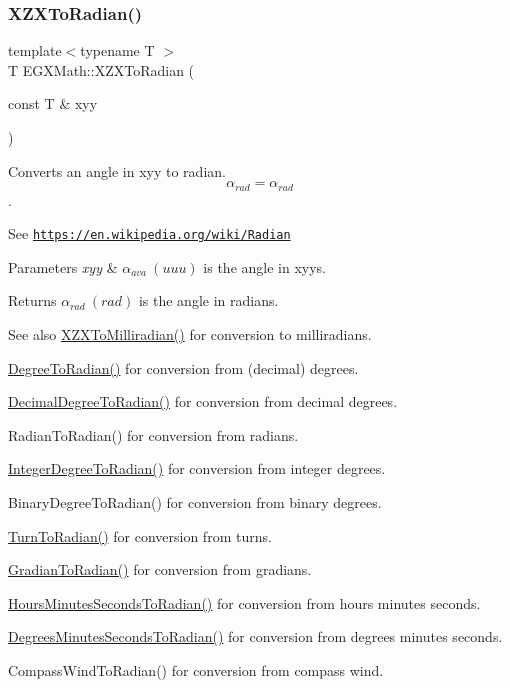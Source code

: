 \subsubsection{\texorpdfstring{X\+Z\+X\+To\+Radian()}{XZXToRadian()}}
{\footnotesize\ttfamily template$<$typename T $>$ \\
T E\+G\+X\+Math\+::\+X\+Z\+X\+To\+Radian (\begin{DoxyParamCaption}\item[{const T \&}]{xyy }\end{DoxyParamCaption})}



Converts an angle in xyy to radian. \[\alpha_{rad}=\alpha_{rad}\]. 

See \href{https://en.wikipedia.org/wiki/Radian}{\tt https\+://en.\+wikipedia.\+org/wiki/\+Radian} 
\begin{DoxyParams}{Parameters}
{\em xyy} & $\alpha_{ava}\ (uuu)$ is the angle in xyys. \\
\hline
\end{DoxyParams}
\begin{DoxyReturn}{Returns}
$\alpha_{rad}\ (rad)$ is the angle in radians. 
\end{DoxyReturn}
\begin{DoxySeeAlso}{See also}
\mbox{\hyperlink{group___e_g_x_math-_angle_conversions-_x_z_x_gadbd00eddee5bd9ee313fabb1a9d3ff3c}{X\+Z\+X\+To\+Milliradian()}} for conversion to milliradians. 

\mbox{\hyperlink{group___e_g_x_math-_angle_conversions-_degree_ga48585541b228c852c9d08a9eac3682f0}{Degree\+To\+Radian()}} for conversion from (decimal) degrees. 

\mbox{\hyperlink{group___e_g_x_math-_angle_conversions-_decimal_degree_ga906ee2c83cdf4caa59eb613dc2d5d52a}{Decimal\+Degree\+To\+Radian()}} for conversion from decimal degrees. 

Radian\+To\+Radian() for conversion from radians. 

\mbox{\hyperlink{group___e_g_x_math-_angle_conversions-_integer_degree_ga05d3368b00ea27b9895de2ffe5c8df38}{Integer\+Degree\+To\+Radian()}} for conversion from integer degrees. 

Binary\+Degree\+To\+Radian() for conversion from binary degrees. 

\mbox{\hyperlink{group___e_g_x_math-_angle_conversions-_turn_ga72e6d3c46ebfc25f7be5050136d8df16}{Turn\+To\+Radian()}} for conversion from turns. 

\mbox{\hyperlink{group___e_g_x_math-_angle_conversions-_gradian_ga7ea0a6f47a672715b960181606c8fd7b}{Gradian\+To\+Radian()}} for conversion from gradians. 

\mbox{\hyperlink{group___e_g_x_math-_angle_conversions-_hours_minutes_seconds_gaa0b04e9012ec739df1464298971e3be7}{Hours\+Minutes\+Seconds\+To\+Radian()}} for conversion from hours minutes seconds. 

\mbox{\hyperlink{group___e_g_x_math-_angle_conversions-_degrees_minutes_seconds_ga6c99d7a2a1646b3d9c8d40cd7f083aa4}{Degrees\+Minutes\+Seconds\+To\+Radian()}} for conversion from degrees minutes seconds. 

Compass\+Wind\+To\+Radian() for conversion from compass wind. 
\end{DoxySeeAlso}
